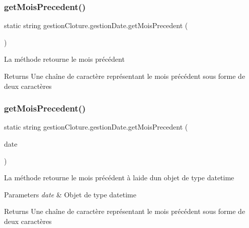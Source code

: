 \subsubsection{\texorpdfstring{get\+Mois\+Precedent()}{getMoisPrecedent()}\hspace{0.1cm}{\footnotesize\ttfamily [1/2]}}
{\footnotesize\ttfamily static string gestion\+Cloture.\+gestion\+Date.\+get\+Mois\+Precedent (\begin{DoxyParamCaption}{ }\end{DoxyParamCaption})\hspace{0.3cm}{\ttfamily [static]}}



La méthode retourne le mois précédent 

\begin{DoxyReturn}{Returns}
Une chaîne de caractère représentant le mois précédent sous forme de deux caractères
\end{DoxyReturn}
\mbox{\label{classgestion_cloture_1_1gestion_date_a0cc7cfb2a7874100e6276188f229819f}} 
\subsubsection{\texorpdfstring{get\+Mois\+Precedent()}{getMoisPrecedent()}\hspace{0.1cm}{\footnotesize\ttfamily [2/2]}}
{\footnotesize\ttfamily static string gestion\+Cloture.\+gestion\+Date.\+get\+Mois\+Precedent (\begin{DoxyParamCaption}\item[{Date\+Time}]{date }\end{DoxyParamCaption})\hspace{0.3cm}{\ttfamily [static]}}



La méthode retourne le mois précédent à l\textquotesingle{}aide d\textquotesingle{}un objet de type datetime 


\begin{DoxyParams}{Parameters}
{\em date} & Objet de type datetime\\
\hline
\end{DoxyParams}
\begin{DoxyReturn}{Returns}
Une chaîne de caractère représentant le mois précédent sous forme de deux caractères
\end{DoxyReturn}
\mbox{\label{classgestion_cloture_1_1gestion_date_aa30693cc45b10c009399d7a547f07dee}} 
